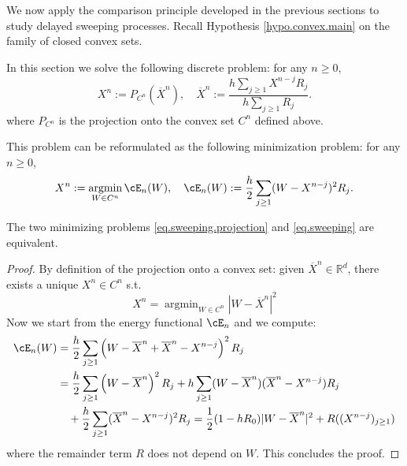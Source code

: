 \documentclass[]{jnsao}
\renewcommand{\tr}{R}
\DeclareMathOperator*{\argmin}{argmin}
\begin{document}
We now apply the comparison principle developed in the previous sections to study delayed sweeping processes.
Recall Hypothesis \ref{hypo.convex.main} on the family of closed convex sets.

In this section we solve the following discrete problem: for any $n\geq 0$,
 \begin{equation}\label{eq.sweeping.projection}
	 X^n := P_{C^n}(\overline{X}^n), \quad \overline{X}^n := \frac{h \sum_{j\geq 1} X^{n-j} \tr_j}{h \sum_{j\geq 1} \tr_j}.
\end{equation}
where $P_{C^n}$ is the projection onto the convex set $C^n$ defined above. 

This problem can be reformulated as the following minimization problem: for any $n\geq 0$,
\begin{equation}\label{eq.sweeping}
	 X^n := \argmin_{W \in C^n} \cE_n(W), \quad \cE_n(W) := \frac{h}{2}\sum_{j\geq1} (W-X^{n-j})^2 \tr_j.
\end{equation}
 
\begin{proposition}
	The two minimizing problems \eqref{eq.sweeping.projection} and \eqref{eq.sweeping} are equivalent.
\end{proposition} 
 
\begin{proof}
	By definition of the projection onto a convex set: given $\overline{X}^n \in \mathbb{R}^d$,
	there exists a unique $X^n \in C^n$ s.t.
	$$
	X^n = \argmin_{W \in C^n} | W - \overline{X}^n |^2 
	$$
	Now we start from the energy functional $\cE_n$ and we compute:
	$$
	\begin{aligned}
		\cE_n(W) & = \frac{h}{2} \sum_{j\geq 1} 
		\left( W - \overline{X}^n + \overline{X}^n - X^{n-j} \right)^2 \tr_j \\
		& = \frac{h}{2} \sum_{j\geq 1} \left( W - \overline{X}^n \right)^2 \tr_j 
		+ h \sum_{j\geq 1} (W - \overline{X}^n)(\overline{X}^n - X^{n-j}) \tr_j	 \\
		& \quad + \frac{h}{2} \sum_{j\geq 1} (\overline{X}^n - X^{n-j})^2 \tr_j 
		= \frac{1}{2}(1-h \tr_0)| W - \overline{X}^n |^2 +  R((X^{n-j})_{j\geq 1})
	\end{aligned}
	$$
	where the remainder term $R$ does not depend on $W$. This concludes the proof.
\end{proof}

 
 
\end{document}
